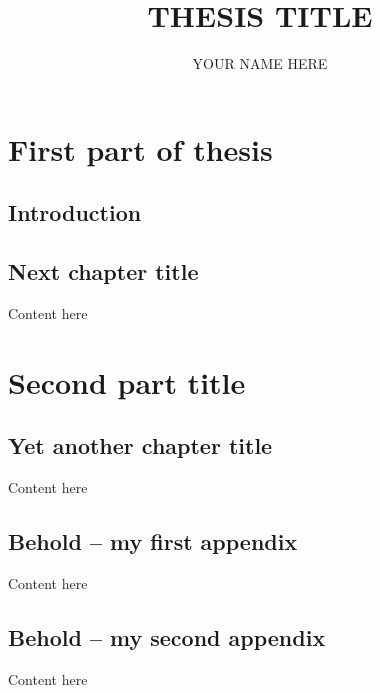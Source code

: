 \documentclass[submit]{./thesis-umich}
\title{THESIS TITLE}
\author{YOUR NAME HERE}
\begin{document}
\acresetall %

\renewcommand\thepart{Part~\Roman{part}:} %
\renewcommand\cftpartpresnum{Part~}


\part{First part of thesis \label{part:my_part_one_label}} 


\acresetall
\chapter{Introduction\label{ch:Introduction}} 


\acresetall
\chapter{Next chapter title\label{ch:next_chapter_label}}
Content here


\acresetall
\part{Second part title\label{part:second_part_label}} %

\acresetall
\chapter{Yet another chapter title\label{ch:astats}}
Content here


\appendix
\begin{appendices}
  \chapter{Behold -- my first appendix}\label{ch:appendix_label}
  Content here
  \chapter{Behold -- my second appendix}\label{ch:another_appendix_label}
  Content here
\end{appendices}
\end{document}
